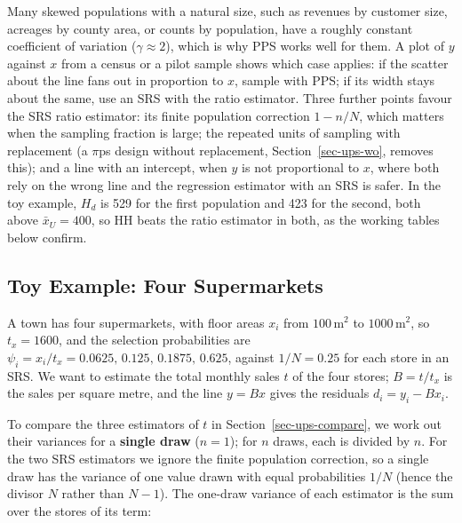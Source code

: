 \documentclass[
  letterpaper,
  DIV=11,
  numbers=noendperiod]{scrreprt}
\renewcommand{\[}{\begin{equation}}
\renewcommand{\]}{\end{equation}}
\begin{document}
Many skewed populations with a natural size, such as revenues by
customer size, acreages by county area, or counts by population, have a
roughly constant coefficient of variation (\(\gamma\approx2\)), which is
why PPS works well for them. A plot of \(y\) against \(x\) from a census
or a pilot sample shows which case applies: if the scatter about the
line fans out in proportion to \(x\), sample with PPS; if its width
stays about the same, use an SRS with the ratio estimator. Three further
points favour the SRS ratio estimator: its finite population correction
\(1-n/N\), which matters when the sampling fraction is large; the
repeated units of sampling with replacement (a \(\pi\)ps design without
replacement, Section~\ref{sec-ups-wo}, removes this); and a line with an
intercept, when \(y\) is not proportional to \(x\), where both rely on
the wrong line and the regression estimator with an SRS is safer. In the
toy example, \(H_d\) is 529 for the first population and 423 for the
second, both above \(\bar{x}_U=400\), so HH beats the ratio estimator in
both, as the working tables below confirm.

\subsection{Toy Example: Four Supermarkets}\label{sec-ups-toy}

A town has four supermarkets, with floor areas \(x_i\) from
\(100\,\text{m}^2\) to \(1000\,\text{m}^2\), so \(t_x=1600\), and the
selection probabilities are
\(\psi_i=x_i/t_x=0.0625,\,0.125,\,0.1875,\,0.625\), against \(1/N=0.25\)
for each store in an SRS. We want to estimate the total monthly sales
\(t\) of the four stores; \(B=t/t_x\) is the sales per square metre, and
the line \(y=Bx\) gives the residuals \(d_i=y_i-Bx_i\).

To compare the three estimators of \(t\) in
Section~\ref{sec-ups-compare}, we work out their variances for a
\textbf{single draw} (\(n=1\)); for \(n\) draws, each is divided by
\(n\). For the two SRS estimators we ignore the finite population
correction, so a single draw has the variance of one value drawn with
equal probabilities \(1/N\) (hence the divisor \(N\) rather than
\(N-1\)). The one-draw variance of each estimator is the sum over the
stores of its term:
\end{document}
